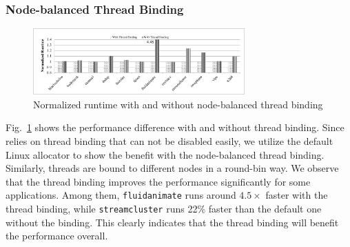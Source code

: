 



\subsubsection{Node-balanced Thread Binding}
\label{sec: threadbinding}

\begin{figure}[!h]
    \centering
    \includegraphics[width=3.2in]{figure/WO-pthread-binding.pdf}
    \caption{Normalized runtime with and without node-balanced thread binding}
    \label{binding-pthread-scalibity}
\end{figure}

Fig.~\ref{binding-pthread-scalibity} shows the performance difference with and without thread binding. Since \NM{} relies on thread binding that can not be disabled easily, we utilize the default Linux allocator to show the benefit with the node-balanced thread binding. Similarly, threads are bound to different nodes in a round-bin way. We observe that the thread binding improves the performance significantly for some applications. Among them, \texttt{fluidanimate} runs around $4.5\times$ faster with the thread binding, while \texttt{streamcluster} runs 22\% faster than the default one without the binding. This clearly indicates that the thread binding will benefit the performance overall. 



